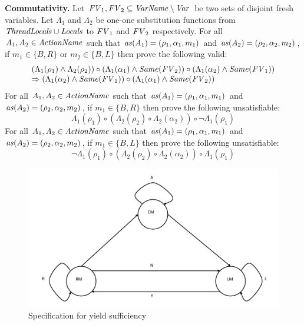 {\bf Commutativity.}
Let $\mathit{FV}_1,\mathit{FV}_2 \subseteq \mathit{VarName} \setminus \mathit{Var}$ be two sets of disjoint fresh variables.
Let $\Lambda_1$ and $\Lambda_2$ be one-one 
substitution functions from $\mathit{ThreadLocals} \cup \mathit{Locals}$ to $\mathit{FV}_1$ and $\mathit{FV}_2$ respectively.
For all $A_1,A_2 \in \mathit{ActionName}$ such that $\mathit{as}(A_1) = (\rho_1,\alpha_1,m_1)$ and $\mathit{as}(A_2) = (\rho_2,\alpha_2,m_2)$,
if $m_1 \in \{B,R\}$ or $m_2 \in \{B,L\}$ then prove the following valid:
\[
\begin{array}{l}
(\Lambda_1(\rho_1) \wedge \Lambda_2(\rho_2)) \circ (\Lambda_1(\alpha_1) \wedge \mathit{Same}(\mathit{FV}_2)) \circ (\Lambda_1(\alpha_2) \wedge \mathit{Same}(\mathit{FV}_1)) \\ 
\Rightarrow (\Lambda_1(\alpha_2) \wedge \mathit{Same}(\mathit{FV}_1)) \circ (\Lambda_1(\alpha_1) \wedge \mathit{Same}(\mathit{FV}_2))
\end{array}
\]
For all $A_1,A_2 \in \mathit{ActionName}$ such that $\mathit{as}(A_1) = (\rho_1,\alpha_1,m_1)$ and $\mathit{as}(A_2) = (\rho_2,\alpha_2,m_2)$,
if $m_1 \in \{B,R\}$ then prove the following unsatisfiable:
\[
\Lambda_1(\rho_1) \circ (\Lambda_2(\rho_2) \circ \Lambda_2(\alpha_2)) \circ \neg \Lambda_1(\rho_1)
\]
For all $A_1,A_2 \in \mathit{ActionName}$ such that $\mathit{as}(A_1) = (\rho_1,\alpha_1,m_1)$ and $\mathit{as}(A_2) = (\rho_2,\alpha_2,m_2)$,
if $m_1 \in \{B,L\}$ then prove the following unsatisfiable:
\[
\neg \Lambda_1(\rho_1) \circ (\Lambda_2(\rho_2) \circ \Lambda_2(\alpha_2)) \circ \Lambda_1(\rho_1)
\]

\begin{figure}
\includegraphics[scale=0.35]{YieldTypeCheckingAutomaton.pdf}
\caption{Specification for yield sufficiency}
\label{fig:YieldTypeCheckingAutomaton}
\end{figure}

